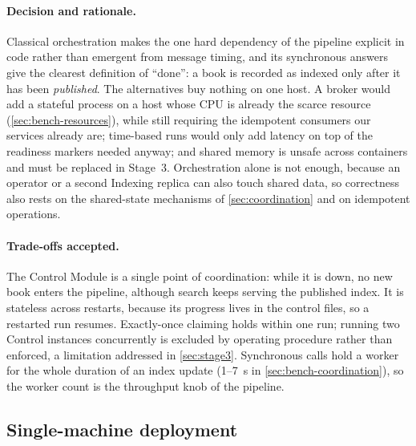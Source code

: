 \documentclass[10pt,a4paper]{article}
\begin{document}
\paragraph{Decision and rationale.}
Classical orchestration makes the one hard dependency of the pipeline explicit
in code rather than emergent from message timing, and its synchronous answers
give the clearest definition of ``done'': a book is recorded as indexed only
after it has been \emph{published}. The alternatives buy nothing on one host. A
broker would add a stateful process on a host whose CPU is already the scarce
resource (\cref{sec:bench-resources}), while still requiring the idempotent
consumers our services already are; time-based runs would only add latency on
top of the readiness markers needed anyway; and shared memory is unsafe across
containers and must be replaced in Stage~3. Orchestration alone is not
enough, because an operator or a second Indexing replica can also touch shared
data, so correctness also rests on the shared-state mechanisms of
\cref{sec:coordination} and on idempotent operations.

\paragraph{Trade-offs accepted.}
The Control Module is a single point of coordination: while it is down, no new
book enters the pipeline, although search keeps serving the published index.
It is stateless across restarts, because its progress lives in the control
files, so a restarted run resumes. Exactly-once claiming holds within one run;
running two Control instances concurrently is excluded by operating procedure
rather than enforced, a limitation addressed in \cref{sec:stage3}. Synchronous
calls hold a worker for the whole duration of an index update (1--7~s in
\cref{sec:bench-coordination}), so the worker count is the throughput knob of
the pipeline.

\subsection{Single-machine deployment}
\label{sec:decision-deployment}
\end{document}
